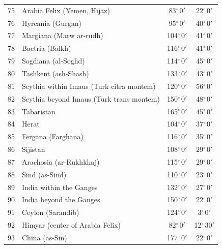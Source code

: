 \documentclass[10pt,a4paper]{article}
\begin{document}
\begin{longtable}{r >{\raggedright\arraybackslash}p{8.5cm} c c}
75 & Arabia Felix (Yemen, Hijaz) & 83$^\circ$\,0$'$ & 22$^\circ$\,0$'$\\
76 & Hyrcania (Gurgan) & 95$^\circ$\,0$'$ & 40$^\circ$\,0$'$\\
77 & Margiana (Marw ar-rudh) & 104$^\circ$\,0$'$ & 41$^\circ$\,0$'$\\
78 & Bactria (Balkh) & 116$^\circ$\,0$'$ & 41$^\circ$\,0$'$\\
79 & Sogdiana (al-Soghd) & 114$^\circ$\,0$'$ & 45$^\circ$\,0$'$\\
80 & Tashkent (ash-Shash) & 133$^\circ$\,0$'$ & 43$^\circ$\,0$'$\\
81 & Scythia within Imaus (Turk citra montem) & 120$^\circ$\,0$'$ & 56$^\circ$\,0$'$\\
82 & Scythia beyond Imaus (Turk trans montem) & 150$^\circ$\,0$'$ & 48$^\circ$\,0$'$\\
83 & Tabaristan & 165$^\circ$\,0$'$ & 45$^\circ$\,0$'$\\
84 & Herat & 104$^\circ$\,0$'$ & 37$^\circ$\,0$'$\\
85 & Fergana (Farghana) & 116$^\circ$\,0$'$ & 35$^\circ$\,0$'$\\
86 & Sijistan & 108$^\circ$\,0$'$ & 29$^\circ$\,0$'$\\
87 & Arachosia (ar-Rukhkhaj) & 115$^\circ$\,0$'$ & 29$^\circ$\,0$'$\\
88 & Sind (as-Sind) & 110$^\circ$\,0$'$ & 23$^\circ$\,0$'$\\
89 & India within the Ganges & 132$^\circ$\,0$'$ & 27$^\circ$\,0$'$\\
90 & India beyond the Ganges & 150$^\circ$\,0$'$ & 22$^\circ$\,0$'$\\
91 & Ceylon (Sarandib) & 124$^\circ$\,0$'$ & 3$^\circ$\,0$'$\\
92 & Himyar (center of Arabia Felix) & 82$^\circ$\,0$'$ & 12$^\circ$\,30$'$\\
93 & China (as-Sin) & 177$^\circ$\,0$'$ & 22$^\circ$\,0$'$\\
\bottomrule\end{longtable}\vspace{4pt}
\\[2pt]
\end{document}
